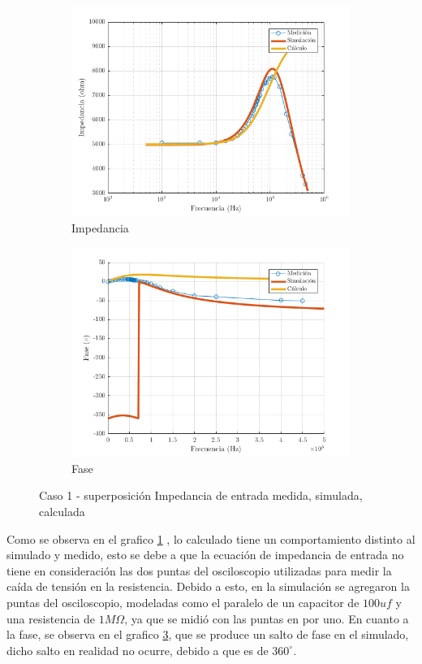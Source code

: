 \documentclass[../../main.tex]{subfiles}
\begin{document}
\begin{figure}[H]
\centering
\begin{subfigure}[http]{0.49\textwidth}
\includegraphics[width=\textwidth]{imagenes/z_inv_r_c1.png}
\caption{Impedancia}\label{fig=zInvZc1}
\end{subfigure}
\begin{subfigure}[http]{0.49\textwidth}
\includegraphics[width=\textwidth]{imagenes/z_inv_f_c1.png}
\caption{Fase} \label{fig=zInvFc1}
\end{subfigure}
\caption{Caso 1 - superposición Impedancia de entrada  medida, simulada, calculada}
\end{figure}

Como se observa en el grafico \ref{fig=zInvZc1} , lo calculado tiene un comportamiento distinto al simulado y medido, esto se debe a que  la ecuación de  impedancia de entrada no tiene en consideración las dos puntas del osciloscopio utilizadas para medir la caída de tensión en la resistencia. Debido a esto, en la simulación se agregaron la puntas del osciloscopio, modeladas como el paralelo de un capacitor de $100uf$ y una resistencia de $1M \Omega $, ya que se midió con las puntas en por uno.
En cuanto a la fase, se observa en el grafico \ref{fig=zInvFc1}, que se produce un salto de fase en el simulado, dicho salto en realidad no ocurre, debido a que es de $360^{\circ}$.
\end{document}
